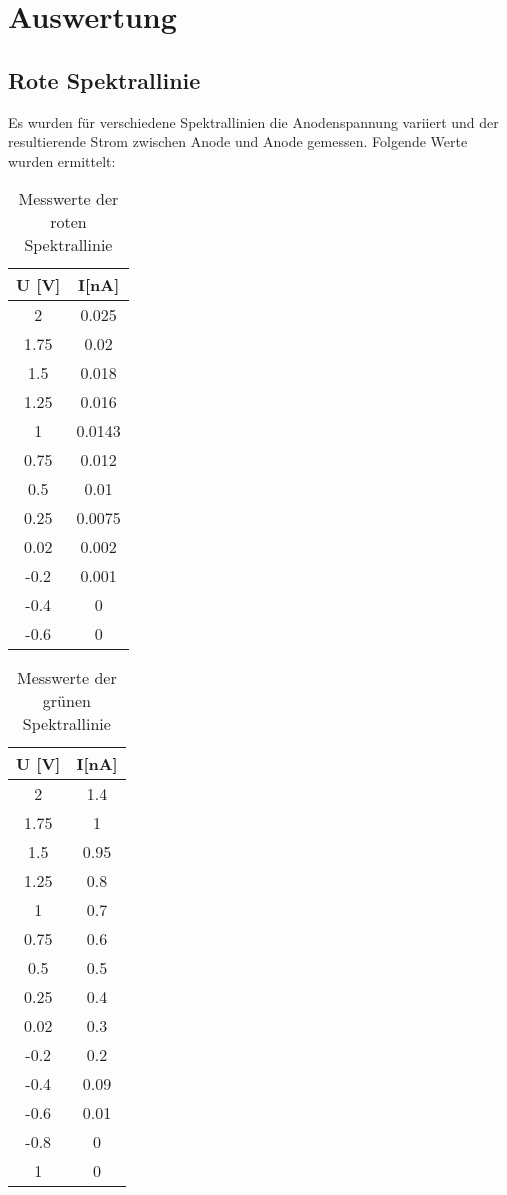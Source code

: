 \section{Auswertung}
\label{sec:Auswertung}

\subsection{Rote Spektrallinie}
  Es wurden für verschiedene Spektrallinien die Anodenspannung variiert und der resultierende
  Strom zwischen Anode und Anode gemessen. Folgende Werte wurden ermittelt:
  \begin{table}[H]
    \centering
    \caption{Messwerte der roten Spektrallinie}
    \begin{tabular}{c c}
     \toprule
      U [V]& I[nA]\\
     \midrule
      2    & 0.025  \\
      1.75 & 0.02   \\
      1.5  & 0.018  \\
      1.25 & 0.016  \\
      1    & 0.0143 \\
      0.75 & 0.012  \\
      0.5  & 0.01   \\
      0.25 & 0.0075 \\
      0.02 & 0.002  \\
     -0.2  & 0.001  \\
     -0.4  & 0      \\
     -0.6  & 0      \\
     \bottomrule
    \end{tabular}
  \end{table}
  \begin{table}[H]
    \centering
    \caption{Messwerte der grünen Spektrallinie}
    \begin{tabular}{c c}
     \toprule
      U [V]& I[nA]\\
     \midrule
     2    & 1.4  \\
     1.75 & 1    \\
     1.5  & 0.95 \\
     1.25 & 0.8  \\
     1    & 0.7  \\
     0.75 & 0.6  \\
     0.5  & 0.5  \\
     0.25 & 0.4  \\
     0.02 & 0.3  \\
    -0.2  & 0.2  \\
    -0.4  & 0.09 \\
    -0.6  & 0.01 \\
    -0.8  & 0    \\
     1    & 0    \\
     \bottomrule
    \end{tabular}
  \end{table}  
